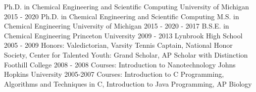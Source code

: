 \begin{cventries}
  \ifcompact
  \cventry
    {Ph.D. in Chemical Engineering and Scientific Computing} %
    {University of Michigan} %
    {} %
    {2015 - 2020} %
    {
    }
  \else
  \cventry
    {Ph.D. in Chemical Engineering and Scientific Computing \linebreak M.S. in Chemical Engineering} %
    {University of Michigan} %
    {} %
    {2015 - 2020  - 2017} %
    {
    }
  \fi
  \cventry
    {B.S.E. in Chemical Engineering} %
    {Princeton University} %
    {} %
    {2009 - 2013} %
    {}
\ifoutdated
  \cventry
    {} %
    {Lynbrook High School} %
    {} %
    {2005 - 2009} %
    {\scriptsize Honors: Valedictorian, Varsity Tennis Captain, National Honor Society, Center for Talented Youth: Grand Scholar, AP Scholar with Distinction
    }
  \cventry
    {} %
    {Foothill College} %
    {} %
    {2008 - 2008} %
    {\scriptsize Courses: Introduction to Nanotechnology
    }
  \cventry
    {} %
    {Johns Hopkins University} %
    {} %
    {2005-2007} %
    {\scriptsize Courses: Introduction to C Programming, Algorithms and Techniques in C, Introduction to Java Programming, AP Biology
    }
\fi
\end{cventries}
